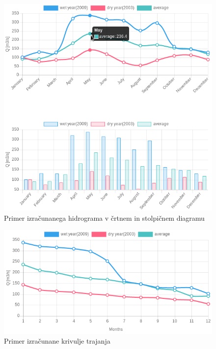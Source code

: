 \begin{figure}[htp!]
	\begin{centering}
		\includegraphics[width=\textwidth]{slike/opis/hidrogram.png}\caption{Primer izračunanega hidrograma v črtnem in stolpičnem diagramu}\label{fig:opis_hidrogram}
	\end{centering}
\end{figure}


\begin{figure}[htp!]
	\begin{centering}
		\includegraphics[width=\textwidth]{slike/opis/krivuljaTrajanja.png}\caption{Primer izračunane krivulje trajanja}\label{fig:opis_krivuljaTrajanja}
	\end{centering}
\end{figure}




